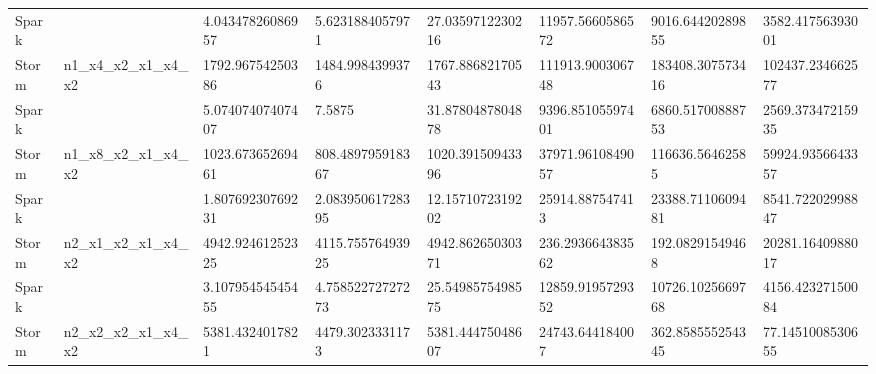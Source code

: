 \documentclass[ppgc,diss,english]{iiufrgs}
\begin{document}
\begin{table}[H]
\begin{tabular}{|l|l|l|l|l|l|l|l|}
Spark    &                                          & 4.04347826086957                         & 5.6231884057971                          & 27.0359712230216                         & \cellcolor[HTML]{67FD9A}11957.5660586572 & \cellcolor[HTML]{67FD9A}9016.64420289855 & \cellcolor[HTML]{67FD9A}3582.41756393001 \\ \cline{1-1} \cline{3-8} 
Storm    & \multirow{-2}{*}{n1\_x4\_x2\_x1\_x4\_x2} & \cellcolor[HTML]{67FD9A}1792.96754250386 & \cellcolor[HTML]{67FD9A}1484.9984399376  & \cellcolor[HTML]{67FD9A}1767.88682170543 & 111913.900306748                         & 183408.307573416                         & 102437.234662577                         \\ \hline
Spark    &                                          & 5.07407407407407                         & 7.5875                                   & 31.8780487804878                         & \cellcolor[HTML]{67FD9A}9396.85105597401 & \cellcolor[HTML]{67FD9A}6860.51700888753 & \cellcolor[HTML]{67FD9A}2569.37347215935 \\ \cline{1-1} \cline{3-8} 
Storm    & \multirow{-2}{*}{n1\_x8\_x2\_x1\_x4\_x2} & \cellcolor[HTML]{67FD9A}1023.67365269461 & \cellcolor[HTML]{67FD9A}808.489795918367 & \cellcolor[HTML]{67FD9A}1020.39150943396 & 37971.9610849057                         & 116636.56462585                          & 59924.9356643357                         \\ \hline
Spark    &                                          & 1.80769230769231                         & 2.08395061728395                         & 12.1571072319202                         & 25914.887547413                          & 23388.7110609481                         & \cellcolor[HTML]{67FD9A}8541.72202998847 \\ \cline{1-1} \cline{3-8} 
Storm    & \multirow{-2}{*}{n2\_x1\_x2\_x1\_x4\_x2} & \cellcolor[HTML]{67FD9A}4942.92461252325 & \cellcolor[HTML]{67FD9A}4115.75576493925 & \cellcolor[HTML]{67FD9A}4942.86265030371 & \cellcolor[HTML]{67FD9A}236.293664383562 & \cellcolor[HTML]{67FD9A}192.08291549468  & 20281.1640988017                         \\ \hline
Spark    &                                          & 3.10795454545455                         & 4.75852272727273                         & 25.5498575498575                         & \cellcolor[HTML]{67FD9A}12859.9195729352 & 10726.1025669768                         & 4156.42327150084                         \\ \cline{1-1} \cline{3-8} 
Storm    & \multirow{-2}{*}{n2\_x2\_x2\_x1\_x4\_x2} & \cellcolor[HTML]{67FD9A}5381.4324017821  & \cellcolor[HTML]{67FD9A}4479.3023331173  & \cellcolor[HTML]{67FD9A}5381.44475048607 & 24743.644184007                          & \cellcolor[HTML]{67FD9A}362.858555254345 & \cellcolor[HTML]{67FD9A}77.1451008530655 \\ \hline

\end{tabular}
\end{table}
\end{document}
